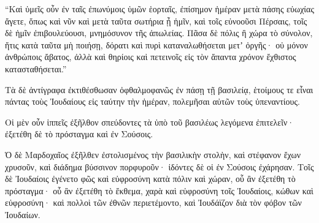 {\par }{\PP {}“Καὶ ὑμεῖς οὖν ἐν ταῖς ἐπωνύμοις ὑμῶν ἑορταῖς, ἐπίσημον ἡμέραν μετὰ πάσης εὐωχίας ἄγετε, ὅπως καὶ νῦν καὶ μετὰ ταῦτα σωτήρια ᾖ ἡμῖν, καὶ τοῖς εὐνοοῦσι Πέρσαις, τοῖς δὲ ἡμῖν ἐπιβουλεύουσι, μνημόσυνον τῆς ἀπωλείας.
Πᾶσα δὲ πόλις ἢ χώρα τὸ σύνολον, ἥτις κατὰ ταῦτα μὴ ποιήσῃ, δόρατι καὶ πυρὶ καταναλωθήσεται μετʼ ὀργῆς· οὐ μόνον ἀνθρώποις ἄβατος, ἀλλὰ καὶ θηρίοις καὶ πετεινοῖς εἰς τὸν ἅπαντα χρόνον ἔχθιστος κατασταθήσεται.”
\par }{\PP {}Τὰ δὲ ἀντίγραφα ἐκτιθέσθωσαν ὀφθαλμοφανῶς ἐν πάσῃ τῇ βασιλείᾳ, ἑτοίμους τε εἶναι πάντας τοὺς Ἰουδαίους εἰς ταύτην τὴν ἡμέραν, πολεμῆσαι αὐτῶν τοὺς ὑπεναντίους.
\par }{\PP {}Οἱ μὲν οὖν ἱππεῖς ἐξῆλθον σπεύδοντες τὰ ὑπὸ τοῦ βασιλέως λεγόμενα ἐπιτελεῖν· ἐξετέθη δὲ τὸ πρόσταγμα καὶ ἐν Σούσοις.
\par }{\PP {}Ὁ δὲ Μαρδοχαῖος ἐξῆλθεν ἐστολισμένος τὴν βασιλικὴν στολὴν, καὶ στέφανον ἔχων χρυσοῦν, καὶ διάδημα βύσσινον πορφυροῦν· ἰδόντες δὲ οἱ ἐν Σούσοις ἐχάρησαν.
Τοῖς δὲ Ἰουδαίοις ἐγένετο φῶς καὶ εὐφροσύνη
κατὰ πόλιν καὶ χώραν, οὗ ἂν ἐξετέθη τὸ πρόσταγμα· οὗ ἂν ἐξετέθη τὸ ἔκθεμα, χαρὰ καὶ εὐφροσύνη τοῖς Ἰουδαίοις, κώθων καὶ εὐφροσύνη· καὶ πολλοὶ τῶν ἐθνῶν περιετέμοντο, καὶ Ἰουδάϊζον διὰ τὸν φόβον τῶν Ἰουδαίων.

}
